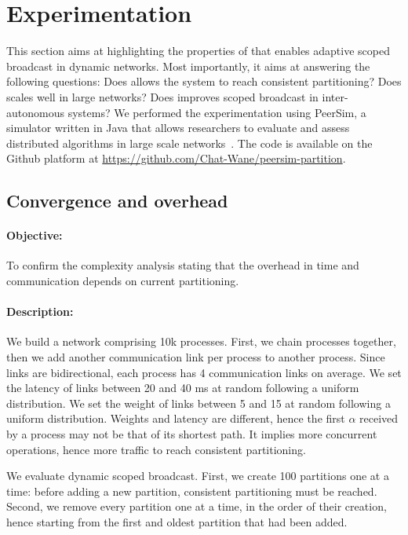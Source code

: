 
\section{Experimentation}
\label{sec:experimentation}

This section aims at highlighting the properties of \NAME that enables
adaptive scoped broadcast in dynamic networks. Most importantly, it
aims at answering the following questions: Does \NAME allows the
system to reach consistent partitioning? Does \NAME scales well in
large networks? Does \NAME improves scoped broadcast in
inter-autonomous systems?  We performed the
experimentation using PeerSim, a simulator written in Java that allows
researchers to evaluate and assess distributed algorithms in large
scale networks~\cite{montresor2009peersim}. The code is available on
the Github platform at
\url{https://github.com/Chat-Wane/peersim-partition}.

\subsection{Convergence and overhead}

\paragraph{Objective:}

To confirm the complexity analysis stating that the overhead in time
and communication depends on current partitioning.

\paragraph{Description:}

We build a network comprising 10k processes. First, we chain processes
together, then we add another communication link per process to
another process. Since links are bidirectional, each process has 4
communication links on average. We set the latency of links between 20
and 40 ms at random following a uniform distribution. We set the
weight of links between 5 and 15 at random following a uniform
distribution. Weights and latency are different, hence the first
$\alpha$ received by a process may not be that of its shortest
path. It implies more concurrent operations, hence more traffic to
reach consistent partitioning.

\noindent We evaluate dynamic scoped broadcast. First, we create 100
partitions one at a time: before adding a new partition, consistent
partitioning must be reached. Second, we remove every partition one at
a time, in the order of their creation, hence starting from the first
and oldest partition that had been added.

